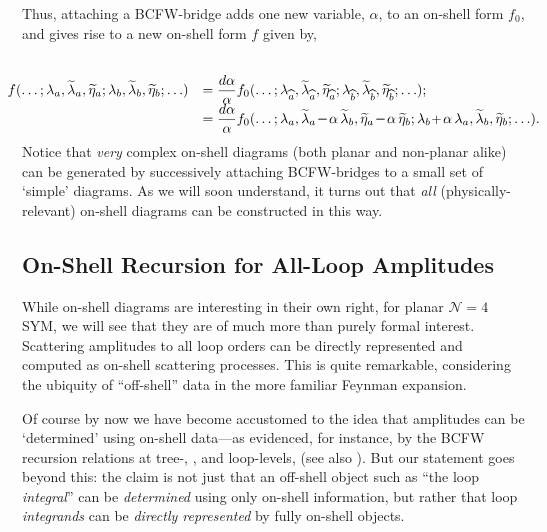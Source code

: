 \documentclass[12pt,hyperref,compress]{JHEP3}
\renewcommand{\hat}{\widehat}
\newcommand{\eq}[1]{\begin{equation}#1\end{equation}}
\newcommand{\mi}{{\rm\rule[2.4pt]{6pt}{0.65pt}}}
\newcommand{\pl}{\hspace{0.5pt}\text{{\small+}}\hspace{-0.5pt}}
\begin{document}
Thus, attaching a BCFW-bridge adds one new variable, $\alpha$,  to an on-shell form $f_0$, and gives rise to  a new on-shell form $f$ given by,
\vspace{-1cm}\eq{\hspace{-3cm}\begin{array}{ll}\\[5pt]\hspace{-0cm}f(\ldots;\lambda_a,\widetilde{\lambda}_a,\widetilde{\eta}_a;\lambda_{b},\widetilde{\lambda}_{b},\widetilde{\eta}_{b};\ldots)&=\displaystyle\frac{d\alpha}{\alpha}f_0(\ldots;\lambda_{\hat{a}},\widetilde{\lambda}_{\hat{a}},\widetilde{\eta}_{\hat{a}};\lambda_{\hat{b}},\widetilde{\lambda}_{\hat{b}},\widetilde{\eta}_{\hat{b}};\ldots);\\~\\[-12pt]
&=\displaystyle\frac{d\alpha}{\alpha}f_0(\ldots;\lambda_a,\widetilde{\lambda}_a\,\mi\,\alpha\,\widetilde{\lambda}_{b},\widetilde{\eta}_a\,\mi\,\alpha\,\widetilde{\eta}_{b};\lambda_{b}\pl\,\alpha\,\lambda_a,\widetilde{\lambda}_{b},\widetilde{\eta}_{b};\ldots).\end{array}\hspace{-3cm}}
Notice that {\it very} complex on-shell diagrams (both planar and non-planar alike) can be generated by successively attaching BCFW-bridges to a small set of `simple' diagrams. As we will soon understand, it turns out that {\it all} (physically-relevant) on-shell diagrams can be constructed in this way.



\subsection{On-Shell Recursion for All-Loop Amplitudes}\label{onshell_diagrams_for_amplitudes_section}

While on-shell diagrams are interesting in their own right,  for planar \mbox{$\mathcal{N}\!=\!4$} SYM, we will see that they are of much more than purely formal interest. Scattering amplitudes to all loop orders can be directly represented and computed as on-shell scattering processes. This is quite remarkable, considering the ubiquity of ``off-shell'' data in the more familiar Feynman expansion.

Of course by now we have become accustomed to the idea that amplitudes  can be `determined' using on-shell data---as evidenced, for instance, by the BCFW recursion relations at tree-, \cite{Britto:2004ap,Britto:2005fq}, and loop-levels, \cite{ArkaniHamed:2010kv} (see also \cite{Bern:2005hs,Dunbar:2010wu,Boels:2010nw,Alston:2012xd}). But our statement goes beyond this: the claim is not just that an off-shell object such as ``the loop {\it integral}'' can be {\it determined} using only on-shell information, but rather that loop {\it integrands} can be {\it directly represented} by fully on-shell objects.
\end{document}
